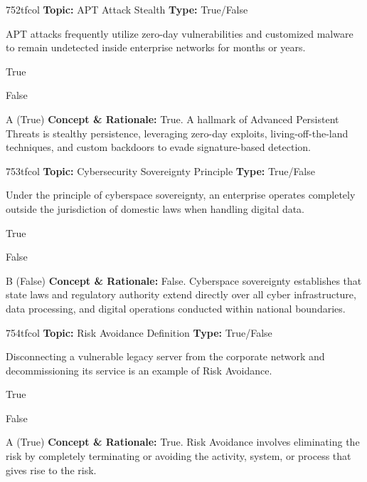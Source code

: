 \begin{qcard}{752}{tfcol}
\textcolor{darkslate!75}{\small\textbf{Topic:} APT Attack Stealth \hfill \textbf{Type:} True/False}\vspace{0.4em}\par
APT attacks frequently utilize zero-day vulnerabilities and customized malware to remain undetected inside enterprise networks for months or years.
\begin{qoptions}
\item True
\item False
\end{qoptions}
\end{qcard}
\nopagebreak
\begin{explainbox}{A (True)}
\textbf{Concept \& Rationale:} True. A hallmark of Advanced Persistent Threats is stealthy persistence, leveraging zero-day exploits, living-off-the-land techniques, and custom backdoors to evade signature-based detection.
\end{explainbox}

\begin{qcard}{753}{tfcol}
\textcolor{darkslate!75}{\small\textbf{Topic:} Cybersecurity Sovereignty Principle \hfill \textbf{Type:} True/False}\vspace{0.4em}\par
Under the principle of cyberspace sovereignty, an enterprise operates completely outside the jurisdiction of domestic laws when handling digital data.
\begin{qoptions}
\item True
\item False
\end{qoptions}
\end{qcard}
\nopagebreak
\begin{explainbox}{B (False)}
\textbf{Concept \& Rationale:} False. Cyberspace sovereignty establishes that state laws and regulatory authority extend directly over all cyber infrastructure, data processing, and digital operations conducted within national boundaries.
\end{explainbox}

\begin{qcard}{754}{tfcol}
\textcolor{darkslate!75}{\small\textbf{Topic:} Risk Avoidance Definition \hfill \textbf{Type:} True/False}\vspace{0.4em}\par
Disconnecting a vulnerable legacy server from the corporate network and decommissioning its service is an example of Risk Avoidance.
\begin{qoptions}
\item True
\item False
\end{qoptions}
\end{qcard}
\nopagebreak
\begin{explainbox}{A (True)}
\textbf{Concept \& Rationale:} True. Risk Avoidance involves eliminating the risk by completely terminating or avoiding the activity, system, or process that gives rise to the risk.
\end{explainbox}

